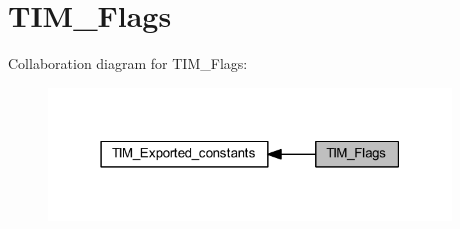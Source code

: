 \hypertarget{group___t_i_m___flags}{}\section{T\+I\+M\+\_\+\+Flags}
\label{group___t_i_m___flags}
Collaboration diagram for T\+I\+M\+\_\+\+Flags\+:\nopagebreak
\begin{figure}[H]
\begin{center}
\leavevmode
\includegraphics[width=303pt]{group___t_i_m___flags}
\end{center}
\end{figure}
